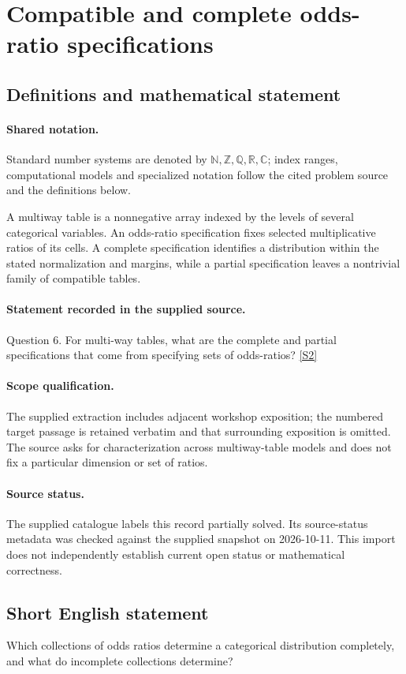 \documentclass[11pt]{article}
\newcommand{\sref}[2]{\hyperlink{source:#1:#2}{[S#2]}}
\begin{document}
\section{Compatible and complete odds-ratio specifications}\label{statement}

\subsection{Definitions and mathematical statement}

\paragraph{Shared notation.}Standard number systems are denoted by $\mathbb N,\mathbb Z,\mathbb Q,\mathbb R,\mathbb C$; index ranges, computational models and specialized notation follow the cited problem source and the definitions below.


A multiway table is a nonnegative array indexed by the levels of several categorical variables. An odds-ratio specification fixes selected multiplicative ratios of its cells. A complete specification identifies a distribution within the stated normalization and margins, while a partial specification leaves a nontrivial family of compatible tables.
\paragraph{Statement recorded in the supplied source.}
Question 6. For multi-way tables, what are the complete and partial specifications that come from specifying sets of odds-ratios? \sref{statement}{2}
\paragraph{Scope qualification.}
The supplied extraction includes adjacent workshop exposition; the numbered target passage is retained verbatim and that surrounding exposition is omitted. The source asks for characterization across multiway-table models and does not fix a particular dimension or set of ratios.
\paragraph{Source status.}
The supplied catalogue labels this record partially solved. Its source-status metadata was checked against the supplied snapshot on 2026-10-11. This import does not independently establish current open status or mathematical correctness.
\subsection{Short English statement}
Which collections of odds ratios determine a categorical distribution completely, and what do incomplete collections determine?
\end{document}
